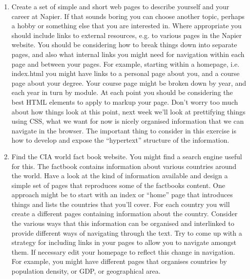 \documentclass[10pt, a4paper]{article}
\begin{document}
\begin{enumerate}
\item Create a set of simple and short web pages to describe yourself and your career at Napier. If that sounds boring you can choose another topic, perhaps a hobby or something else that you are interested in. Where appropriate you should include links to external resources, e.g. to various pages in the Napier website. You should be considering how to break things down into separate pages, and also what internal links you might need for navigation within each page and between your pages. For example, starting within a homepage, i.e. index.html you might have links to a personal page about you, and a course page about your degree. Your course page might be broken down by year, and each year in turn by module. At each point you should be considering the best HTML elements to apply to markup your page. Don't worry too much about how things look at this point, next week we'll look at prettifying things using CSS, what we want for now is nicely organised information that we can navigate in the browser. The important thing to consider in this exercise is how to develop and expose the ``hypertext'' structure of the information.
\item Find the CIA world fact book website. You might find a search engine useful for this. The factbook contains information about various countries around the world. Have a look at the kind of information available and design a simple set of pages that reproduces some of the factbooks content. One approach might be to start with an index or ``home'' page that introduces things and lists the countries that you'll cover. For each country you will create a different pages containing information about the country. Consider the various ways that this information can be organised and interlinked to provide different ways of navigating through the text. Try to come up with a strategy for including links in your pages to allow you to navigate amongst them. If necessary edit your homepage to reflect this change in navigation. For example, you might have different pages that organises countries by population density, or GDP, or geographical area.

\end{enumerate}
\end{document}
